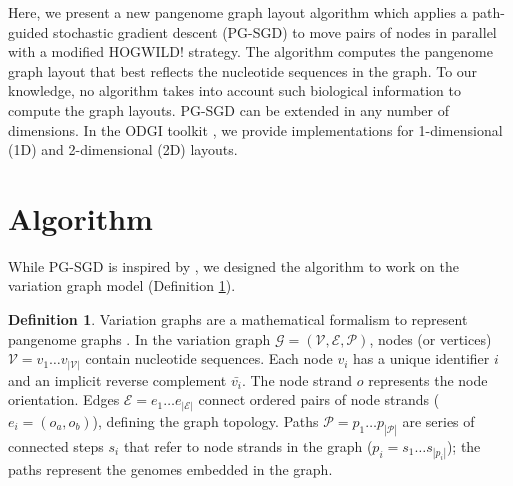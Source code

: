 \documentclass{bioinfo}
\theoremstyle{definition}
\newtheorem{definition}{Definition}[section]
\begin{document}
	Here, we present a new pangenome graph layout algorithm which applies a path-guided stochastic gradient descent (PG-SGD) to move pairs of nodes in parallel with a modified HOGWILD! strategy.
	The algorithm computes the pangenome graph layout that best reflects the nucleotide sequences in the graph.
	To our knowledge, no algorithm takes into account such biological information to compute the graph layouts.
	PG-SGD can be extended in any number of dimensions.
	In the ODGI toolkit \citep{Guarracino2022}, we provide implementations for 1-dimensional (1D) and 2-dimensional (2D) layouts.

	\section{Algorithm}

	While PG-SGD is inspired by \cite{Zheng2019}, we designed the algorithm to work on the variation graph model (Definition \ref{def:vg}).
	
	\begin{definition}
		\label{def:vg}
		Variation graphs are a mathematical formalism to represent pangenome graphs \citep{Garrison_2019_thesis}.
		In the variation graph $\mathcal{G} = (\mathcal{V}, \mathcal{E}, \mathcal{P})$, nodes (or vertices) $\mathcal{V} = v_1\ldots v_{|\mathcal{V}|}$ contain nucleotide sequences.
		Each node $v_i$ has a unique identifier $i$ and an implicit reverse complement $\bar{v_i}$.
		The node strand $o$ represents the node orientation.
		Edges $\mathcal{E} = e_1\ldots e_{|\mathcal{E}|}$ connect ordered pairs of node strands ($e_i = ( o_a, o_b )$), defining the graph topology.
		Paths $\mathcal{P} = p_1\ldots p_{|\mathcal{P}|}$ are series of connected steps $s_i$ that refer to node strands in the graph ($p_i = s_1 \ldots s_{|p_i|}$); the paths represent the genomes embedded in the graph.
	\end{definition}
	
\end{document}
